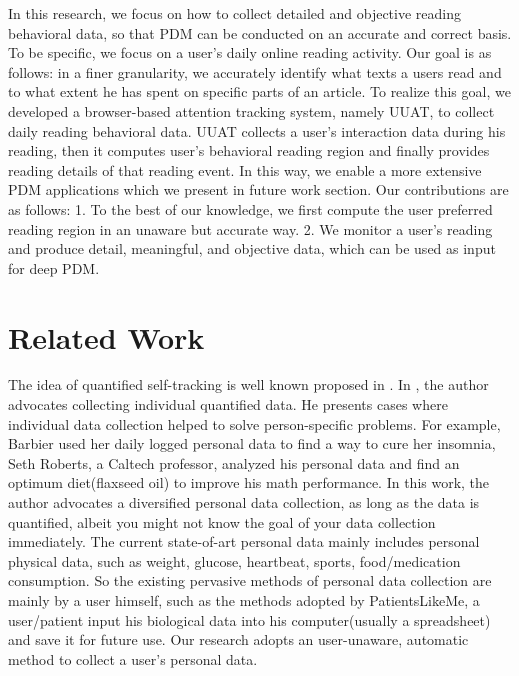 \documentclass{sigchi}
\begin{document}
In this research, we focus on how to collect detailed  and objective reading behavioral data, so that PDM can be conducted on an accurate and correct basis. To be specific, we focus on a user’s daily online reading activity. Our goal is as follows: in a finer granularity,   
we accurately identify what texts a users read and to what extent he has spent on specific parts of an article. To realize this goal, we developed a browser-based attention tracking system, namely UUAT, to collect daily reading behavioral data. UUAT collects a user's
interaction data during his reading, then it computes user's behavioral reading region and finally provides reading details of that reading event. In this way, we enable a more extensive PDM applications which we present in future work section. Our contributions are as follows: 1. To the best of our knowledge, we first compute the user preferred reading region in an unaware but accurate way. 2. We monitor a user's reading and produce detail, meaningful, and objective data, which can be used as input for deep PDM.


\section{Related Work}

The idea of quantified self-tracking is well known proposed in \cite{wolf2010data}. In \cite{wolf2010data}, the author advocates collecting individual quantified data. He presents cases where individual data collection helped to solve person-specific problems. For example, Barbier used her daily logged personal data to find a way to cure her insomnia\cite{wolf2010data},  Seth Roberts, a Caltech professor, analyzed his personal data and find an optimum diet(flaxseed oil) to improve his math performance\cite{wolf2010data}. In this work, the author advocates a diversified personal data collection, as long as the data is quantified, albeit you might not know the goal of your data collection immediately. The current state-of-art personal data mainly includes personal physical data, such as weight, glucose, heartbeat, sports, food/medication consumption. So the existing pervasive methods of personal data collection are mainly by a user himself, such as the methods adopted by PatientsLikeMe\cite{plm}, a user/patient input his biological data into his computer(usually a spreadsheet) and save it for future use.  Our research adopts an user-unaware, automatic method to collect a user's personal data. 
\end{document}

